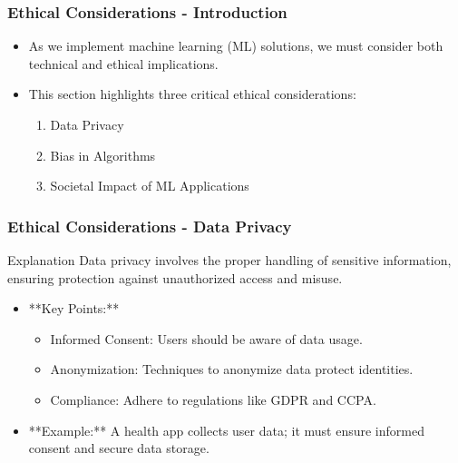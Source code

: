 \documentclass[aspectratio=169]{beamer}
\begin{document}
\begin{frame}[fragile]
    \frametitle{Ethical Considerations - Introduction}
    \begin{itemize}
        \item As we implement machine learning (ML) solutions, we must consider both technical and ethical implications.
        \item This section highlights three critical ethical considerations:
        \begin{enumerate}
            \item Data Privacy
            \item Bias in Algorithms
            \item Societal Impact of ML Applications
        \end{enumerate}
    \end{itemize}
\end{frame}

\begin{frame}[fragile]
    \frametitle{Ethical Considerations - Data Privacy}
    \begin{block}{Explanation}
        Data privacy involves the proper handling of sensitive information, ensuring protection against unauthorized access and misuse.
    \end{block}
    \begin{itemize}
        \item **Key Points:**
        \begin{itemize}
            \item Informed Consent: Users should be aware of data usage.
            \item Anonymization: Techniques to anonymize data protect identities.
            \item Compliance: Adhere to regulations like GDPR and CCPA.
        \end{itemize}
        \item **Example:** A health app collects user data; it must ensure informed consent and secure data storage.
    \end{itemize}
\end{frame}
\end{document}
